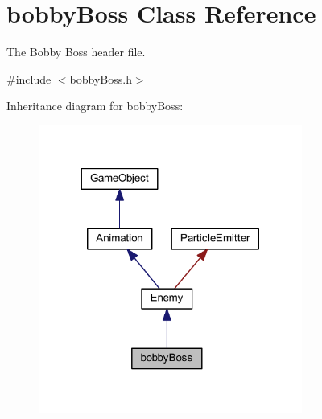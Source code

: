 \hypertarget{classbobby_boss}{\section{bobby\+Boss Class Reference}
\label{classbobby_boss}
}


The Bobby Boss header file.  




{\ttfamily \#include $<$bobby\+Boss.\+h$>$}



Inheritance diagram for bobby\+Boss\+:\nopagebreak
\begin{figure}[H]
\begin{center}
\leavevmode
\includegraphics[width=245pt]{classbobby_boss__inherit__graph}
\end{center}
\end{figure}


